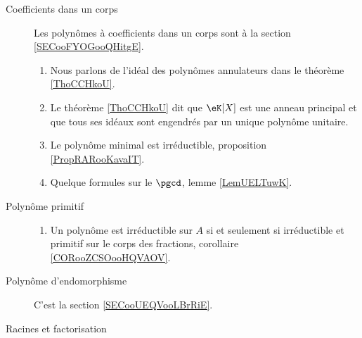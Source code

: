 \begin{description}
    \item[Coefficients dans un corps]
Les polynômes à coefficients dans un corps sont à la section \ref{SECooFYOGooQHitgE}.
        \begin{enumerate}
                
\item
Nous parlons de l'idéal des polynômes annulateurs dans le théorème \ref{ThoCCHkoU}.
            \item
                Le théorème \ref{ThoCCHkoU} dit que \( \eK[X]\) est une anneau principal et que tous ses idéaux sont engendrés par un unique polynôme unitaire.
            \item
                Le polynôme minimal est irréductible, proposition \ref{PropRARooKavaIT}.
            \item
                Quelque formules sur le \( \pgcd\), lemme \ref{LemUELTuwK}.
        \end{enumerate}
    \item[Polynôme primitif]
    
        \begin{enumerate}
            \item
                Un polynôme est irréductible sur \( A\) si et seulement si irréductible et primitif sur le corps des fractions, corollaire \ref{CORooZCSOooHQVAOV}.
        \end{enumerate}

    \item[Polynôme d'endomorphisme]
        C'est la section \ref{SECooUEQVooLBrRiE}.

    \item[Racines et factorisation]


\end{description}
